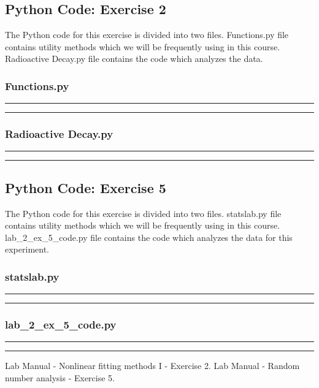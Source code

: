 \documentclass[letterpaper,12pt]{article}
\begin{document}
\pagebreak

\subsection{Python Code: Exercise 2}

The Python code for this exercise is divided into two files. Functions.py file contains utility methods
which we will be frequently using in this course. Radioactive Decay.py file contains the code which analyzes
the data.

\subsubsection{Functions.py}
\noindent\rule{\textwidth}{1pt}

\noindent\rule{\textwidth}{1pt}

\pagebreak

\subsubsection{Radioactive Decay.py}
\noindent\rule{\textwidth}{1pt}

\noindent\rule{\textwidth}{1pt}

\pagebreak

\subsection{Python Code: Exercise 5}

The Python code for this exercise is divided into two files. statslab.py file 
contains utility methods
which we will be frequently using in this course. lab\_2\_ex\_5\_code.py file contains 
the code which analyzes
the data for this experiment.

\subsubsection{statslab.py}

\noindent\rule{\textwidth}{1pt}

\noindent\rule{\textwidth}{1pt}

\pagebreak

\subsubsection{lab\_2\_ex\_5\_code.py}
\noindent\rule{\textwidth}{1pt}

\noindent\rule{\textwidth}{1pt}
\pagebreak

\begin{thebibliography}{99}

 Lab Manual - Nonlinear fitting methods I - Exercise 2.
 Lab Manual - Random number analysis - Exercise 5.

\end{thebibliography}
\end{document}
